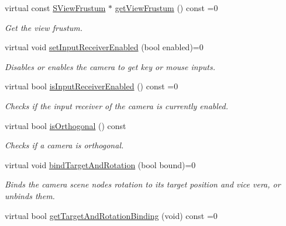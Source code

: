 \begin{DoxyCompactItemize}
virtual const \hyperlink{structirr_1_1scene_1_1SViewFrustum}{S\+View\+Frustum} $\ast$ \hyperlink{classirr_1_1scene_1_1ICameraSceneNode_add0cba097d3e59714546f04f2c53477e}{get\+View\+Frustum} () const =0
\begin{DoxyCompactList}\small\item\em Get the view frustum. \end{DoxyCompactList}\item 
virtual void \hyperlink{classirr_1_1scene_1_1ICameraSceneNode_a5b5c89233c1805676d6fcb392236dfec}{set\+Input\+Receiver\+Enabled} (bool enabled)=0
\begin{DoxyCompactList}\small\item\em Disables or enables the camera to get key or mouse inputs. \end{DoxyCompactList}\item 
\mbox{\label{classirr_1_1scene_1_1ICameraSceneNode_a15eeaf8a5c69af91d920b8243f76796f}} 
virtual bool \hyperlink{classirr_1_1scene_1_1ICameraSceneNode_a15eeaf8a5c69af91d920b8243f76796f}{is\+Input\+Receiver\+Enabled} () const =0
\begin{DoxyCompactList}\small\item\em Checks if the input receiver of the camera is currently enabled. \end{DoxyCompactList}\item 
\mbox{\label{classirr_1_1scene_1_1ICameraSceneNode_a5cfd588d836004923f01667543837d6c}} 
virtual bool \hyperlink{classirr_1_1scene_1_1ICameraSceneNode_a5cfd588d836004923f01667543837d6c}{is\+Orthogonal} () const
\begin{DoxyCompactList}\small\item\em Checks if a camera is orthogonal. \end{DoxyCompactList}\item 
virtual void \hyperlink{classirr_1_1scene_1_1ICameraSceneNode_ad8785d7b2f730933a8d4425ac54e7205}{bind\+Target\+And\+Rotation} (bool bound)=0
\begin{DoxyCompactList}\small\item\em Binds the camera scene node\textquotesingle{}s rotation to its target position and vice vera, or unbinds them. \end{DoxyCompactList}\item 
virtual bool \hyperlink{classirr_1_1scene_1_1ICameraSceneNode_a343be24b2c43db7580127229db2dec6a}{get\+Target\+And\+Rotation\+Binding} (void) const =0

\end{DoxyCompactItemize}
